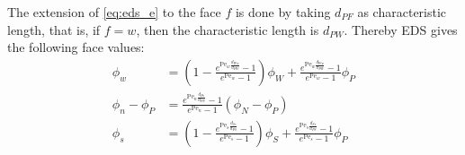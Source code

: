 The extension of \eqref{eq:eds_e} to the face $f$ is done by taking $d_{PF}$ as
characteristic length, that is, if $f = w$, then the characteristic length is
$d_{PW}$. Thereby EDS gives the following face values:
\begin{align}
	\phi_w &= 
	\left( 1 - \frac{e^{\mathrm{Pe}_w \frac{d_{Ww}}{d_{PW}}} - 1}{e^{\mathrm{Pe}_w} - 1} \right)
	 \phi_W + 
	\frac{e^{\mathrm{Pe}_w \frac{d_{Ww}}{d_{PW}}} - 1}{e^{\mathrm{Pe}_w} - 1} \phi_P \\
	\phi_n - \phi_P &= 
	\frac{e^{\mathrm{Pe}_n \frac{d_{Pn}}{d_{PN}}} - 1}{e^{\mathrm{Pe}_n} - 1} (\phi_N - \phi_P) \\
	\phi_s &= 
	\left( 1 - \frac{e^{\mathrm{Pe}_s \frac{d_{Ss}}{d_{PS}}} - 1}{e^{\mathrm{Pe}_s} - 1} \right)
	\phi_S + 
	\frac{e^{\mathrm{Pe}_s \frac{d_{Ss}}{d_{PS}}} - 1}{e^{\mathrm{Pe}_s} - 1} \phi_P
	\label{eq:eds_s}	
\end{align}